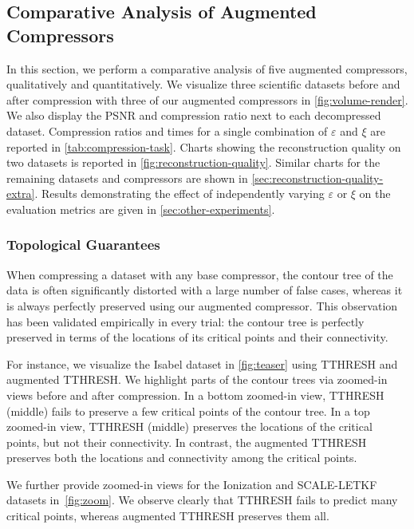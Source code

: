 \subsection{Comparative Analysis of Augmented Compressors}
\label{sec:augmented-compressors}

In this section, we perform a comparative analysis of five augmented compressors, qualitatively and quantitatively. 
We visualize three scientific datasets before and after compression with {three of our augmented compressors} in \cref{fig:volume-render}. We also display the PSNR and compression ratio next to each decompressed dataset. 
Compression ratios and times for a single combination of $\varepsilon$ and $\xi$ are reported in \cref{tab:compression-task}. Charts showing the reconstruction quality on two datasets is reported in \cref{fig:reconstruction-quality}. Similar charts for the remaining datasets and compressors are shown in \cref{sec:reconstruction-quality-extra}. Results demonstrating the effect of independently varying $\varepsilon$ or $\xi$ on the evaluation metrics are given in \cref{sec:other-experiments}.

\subsubsection{Topological Guarantees}
When compressing a dataset with any base compressor, the contour tree of the data is often significantly distorted with a large number of false cases, whereas it is always perfectly preserved using our augmented compressor. This observation has been validated empirically in every trial: the contour tree is perfectly preserved in terms of the locations of its critical points and their connectivity.

For instance, we visualize the Isabel dataset in \cref{fig:teaser} using TTHRESH and augmented TTHRESH. We highlight parts of the contour trees via zoomed-in views before and after compression. In a bottom zoomed-in view, TTHRESH (middle) fails to preserve a few critical points of the contour tree. In a top zoomed-in view, TTHRESH (middle) preserves the locations of the critical points, but not their connectivity. In contrast, the augmented TTHRESH preserves both the locations and connectivity among the critical points.

We further provide zoomed-in views for the Ionization and SCALE-LETKF datasets in~\cref{fig:zoom}. We observe clearly that TTHRESH fails to predict many critical points, whereas augmented TTHRESH preserves them all.

